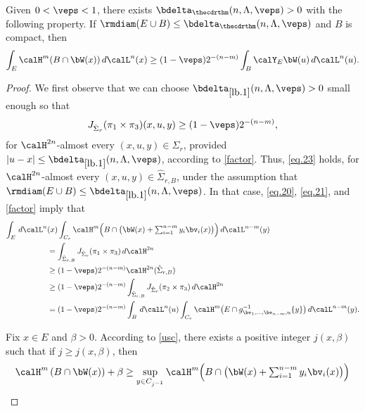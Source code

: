 \begin{Proposition}
\label{lb.1}
Given $0 < \veps < 1$, there exists $\bdelta_{\thecdrthm}(n,\Lambda,\veps) > 0$ with the following property.
If $\rmdiam (E \cup B) \leq \bdelta_{\thecdrthm}(n,\Lambda,\veps)$ and $B$ is compact, then
\begin{equation*}
\int_E \calH^m(B \cap \bW(x)) \,d\calL^n(x) \geq (1-\veps)2^{-(n-m)} \int_B \calY_E \bW(u) \,d\calL^n(u).
\end{equation*}
\end{Proposition}

\begin{proof}
We first observe that we can choose $\bdelta_{\ref{lb.1}}(n,\Lambda,\veps) > 0$ small enough so that
\begin{equation}
\label{eq.23}
J_{\hat{\Sigma}_r} (\pi_1 \times \pi_3)(x,u,y) \geq (1-\veps) 2^{-(n-m)},
\end{equation}
for $\calH^{2n}$-almost every $(x,u,y) \in \hat{\Sigma}_r$, provided $|u-x| \leq \bdelta_{\ref{lb.1}}(n,\Lambda,\veps)$, according to \ref{factor}.
Thus, \eqref{eq.23} holds, for $\calH^{2n}$-almost every $(x,u,y) \in \hat{\Sigma}_{r,B}$, under the assumption that $\rmdiam (E \cup B) \leq \bdelta_{\ref{lb.1}}(n,\Lambda,\veps)$.
In that case, \eqref{eq.20}, \eqref{eq.21}, and \ref{factor} imply that
\begin{align}
\int_E \,d\calL^n&(x) \int_{C_r} \textstyle\calH^m \Bigl(B \cap \bigl(\bW(x) + \sum_{i=1}^{n-m} y_i \bv_i(x) \bigr) \Bigr) \,d\calL^{n-m}(y)\notag \\
&= \int_{\hat{\Sigma}_{r,B}} J_{\hat{\Sigma}_r} (\pi_1 \times \pi_3) \,d\calH^{2n} \notag\\
& \geq (1-\veps)2^{-(n-m)} \calH^{2n}(\hat{\Sigma}_{r,B})\label{eq.25} \\
& \geq (1-\veps) 2^{-(n-m)}\int_{\hat{\Sigma}_{r,B}} J_{\hat{\Sigma}_r} (\pi_2 \times \pi_3) \,d\calH^{2n} \notag\\
& = (1-\veps) 2^{-(n-m)} \int_B \,d\calL^n(u) \int_{C_r} \calH^m \bigl(E \cap g_{\bv_1,\ldots,\bv_{n-m},u}^{-1}\{y\} \bigr)\,d\calL^{n-m}(y).\notag
\end{align}
\par
Fix $x \in E$ and $\beta > 0$.
According to \ref{usc}, there exists a positive integer $j(x,\beta)$ such that if $j \geq j(x,\beta)$, then
\begin{equation*}
\begin{split}
\calH^m \left(B \cap \bW(x) \right) + \beta & \geq \sup_{y \in C_{j^{-1}}}
\textstyle\calH^m \Bigl(B \cap \bigl(\bW(x) + \sum_{i=1}^{n-m} y_i \bv_i(x) \bigr) \Bigr) \\

\end{split}
\end{equation*}
\end{proof}
